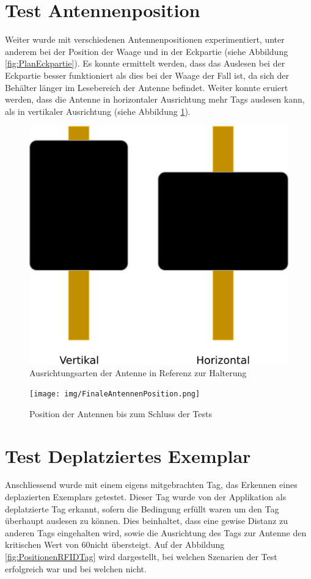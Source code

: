 \documentclass[parskip=full, a4paper]{scrartcl}
\begin{document}
\section{Test Antennenposition}
Weiter wurde mit verschiedenen Antennenpositionen experimentiert, unter anderem bei der Position der Waage und in der Eckpartie (siehe Abbildung \ref{fig:PlanEckpartie}). Es konnte ermittelt werden, dass das Auslesen bei der Eckpartie besser funktioniert als dies bei der Waage der Fall ist, da sich der Behälter länger im Lesebereich der Antenne befindet. Weiter konnte eruiert werden, dass die Antenne in horizontaler Ausrichtung mehr Tags auslesen kann, als in vertikaler Ausrichtung (siehe Abbildung \ref{fig:AusrichtungAntenne}).

\begin{figure}[htb]
	\centering
	\includegraphics[keepaspectratio,width=0.6\linewidth]{img/AusrichtungAntenne.png}
	\caption{Ausrichtungsarten der Antenne in Referenz zur Halterung}
	\label{fig:AusrichtungAntenne}
\end{figure}

\begin{figure}[htb]
	\centering
	\texttt{[image: img/FinaleAntennenPosition.png]}
	\caption{Position der Antennen bis zum Schluss der Tests}
	\label{fig:FinalePositionAntennen}
\end{figure}

\section{Test Deplatziertes Exemplar}
Anschliessend wurde mit einem eigens mitgebrachten Tag, das Erkennen eines deplazierten Exemplars getestet. Dieser Tag wurde von der Applikation als deplatzierte Tag erkannt, sofern die Bedingung erfüllt waren um den Tag überhaupt auslesen zu können. Dies beinhaltet, dass eine gewise Distanz zu anderen Tags eingehalten wird, sowie die Ausrichtung des Tags zur Antenne den kritischen Wert von 60\SIUnitSymbolDegree nicht übersteigt. Auf der Abbildung \ref{fig:PositionenRFIDTag} wird dargestellt, bei welchen Szenarien der Test erfolgreich war und bei welchen nicht.
\end{document}
